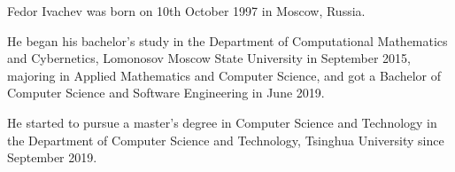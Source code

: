 
\begin{resume}

    Fedor Ivachev was born on 10th October 1997 in Moscow, Russia.
    
    He began his bachelor's study in the Department of Computational Mathematics and Cybernetics, Lomonosov Moscow State University in September 2015, majoring in Applied Mathematics and Computer Science, and got a Bachelor of Computer Science and Software Engineering in June 2019.
    
    He started to pursue a master's degree in Computer Science  and Technology in the Department of Computer Science and Technology, Tsinghua University since September 2019.

\end{resume}
